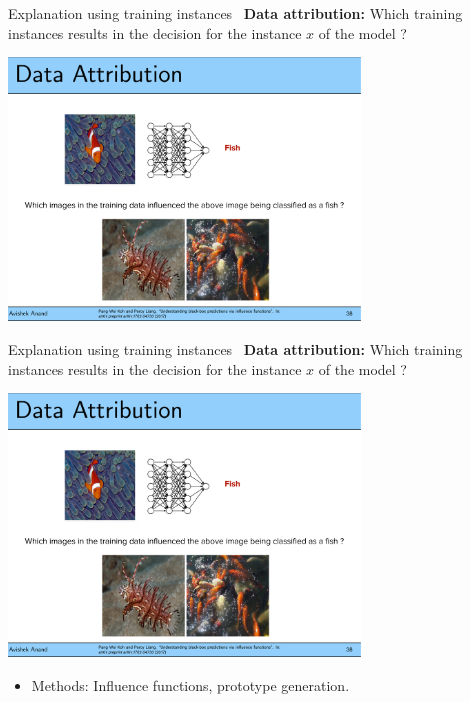\documentclass[aspectratio=169]{../latex_main/tntbeamer}  %
\begin{document}
\begin{frame}[c]{Explanation using training instances~}
	\vspace{-1em}
	\textbf{Data attribution:} Which training instances results in the decision for the instance $x$ of the model ?
	\begin{center}
		\includegraphics[page=1, width=0.7\textwidth]{01_introduction/figure/fish-attribution.pdf}
	\end{center}
	
\end{frame}

\begin{frame}[c]{Explanation using training instances~}
	\vspace{-1em}
	\textbf{Data attribution:} Which training instances results in the decision for the instance $x$ of the model ?
	\begin{center}
		\includegraphics[page=1, width=0.7\textwidth]{01_introduction/figure/prototypes-fish.pdf}
	\end{center}
	\begin{itemize}
		\item Methods: 
		Influence functions, prototype generation.
	\end{itemize}
\end{frame}
\end{document}
